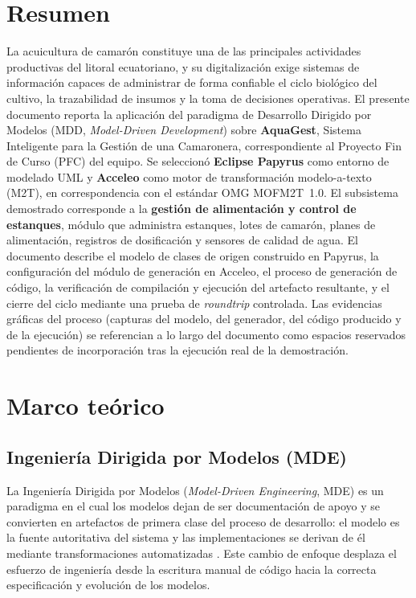 \documentclass[11pt,a4paper]{article}
\begin{document}
\section*{Resumen}
La acuicultura de camarón constituye una de las principales actividades productivas del litoral
ecuatoriano, y su digitalización exige sistemas de información capaces de administrar de forma
confiable el ciclo biológico del cultivo, la trazabilidad de insumos y la toma de decisiones operativas.
El presente documento reporta la aplicación del paradigma de Desarrollo Dirigido por Modelos (MDD,
\textit{Model-Driven Development}) sobre \textbf{AquaGest}, Sistema Inteligente para la Gestión de una
Camaronera, correspondiente al Proyecto Fin de Curso (PFC) del equipo. Se seleccionó
\textbf{Eclipse Papyrus} como entorno de modelado UML y \textbf{Acceleo} como motor de
transformación modelo-a-texto (M2T), en correspondencia con el estándar OMG MOFM2T~1.0. El
subsistema demostrado corresponde a la \textbf{gestión de alimentación y control de estanques},
módulo que administra estanques, lotes de camarón, planes de alimentación, registros de dosificación
y sensores de calidad de agua. El documento describe el modelo de clases de origen construido en
Papyrus, la configuración del módulo de generación en Acceleo, el proceso de generación de código,
la verificación de compilación y ejecución del artefacto resultante, y el cierre del ciclo mediante una
prueba de \textit{roundtrip} controlada. Las evidencias gráficas del proceso (capturas del modelo, del
generador, del código producido y de la ejecución) se referencian a lo largo del documento como
espacios reservados pendientes de incorporación tras la ejecución real de la demostración.

\section{Marco teórico}
\subsection{Ingeniería Dirigida por Modelos (MDE)}
La Ingeniería Dirigida por Modelos (\textit{Model-Driven Engineering}, MDE) es un paradigma en el
cual los modelos dejan de ser documentación de apoyo y se convierten en artefactos de primera clase
del proceso de desarrollo: el modelo es la fuente autoritativa del sistema y las implementaciones se
derivan de él mediante transformaciones automatizadas \cite{schmidt2006,bucchiarone2020}. Este
cambio de enfoque desplaza el esfuerzo de ingeniería desde la escritura manual de código hacia la
correcta especificación y evolución de los modelos.
\end{document}
